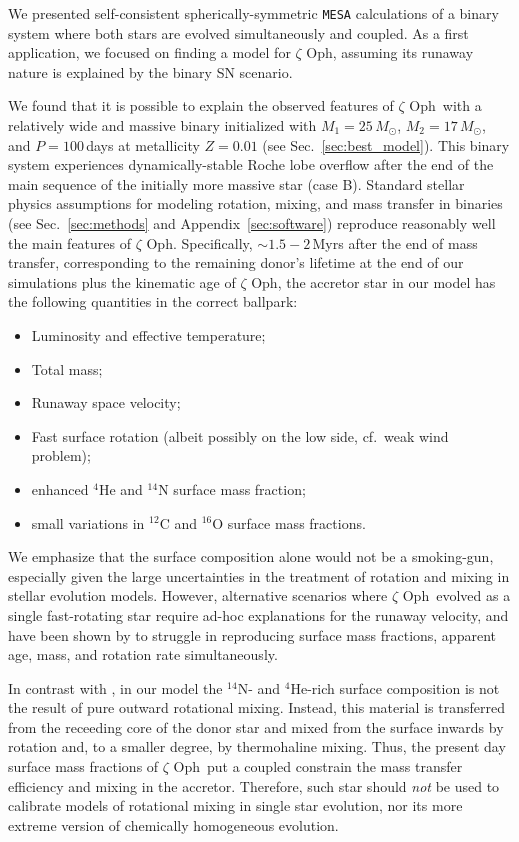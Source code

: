 \documentclass[twocolumn,twocolappendix,trackchanges]{aastex63}
\DeclareRobustCommand{\Secref}[1]{Sec.~\ref{#1}}
\newcommand{\zoph}{$\zeta$ Oph}
\begin{document}
We presented self-consistent spherically-symmetric \texttt{MESA}
calculations of a binary system where both stars are evolved
simultaneously and coupled. As a first application, we focused on
finding a model for \zoph, assuming its runaway nature is explained by
the binary SN scenario.

We found that it is possible to explain the observed features of
\zoph\ with a relatively wide and massive binary initialized with
$M_1=25\,M_\odot$, $M_2=17\,M_\odot$, and $P=100$\,days at metallicity
$Z=0.01$ (see \Secref{sec:best_model}). This binary system experiences dynamically-stable Roche
lobe overflow after the end of the main sequence of the initially more massive star
(case B). Standard stellar physics assumptions for modeling rotation,
mixing, and mass transfer in binaries (see \Secref{sec:methods} and
Appendix~\ref{sec:software}) reproduce reasonably well the
main features of \zoph. Specifically,
$\sim$$1.5-2$\,Myrs after the end of mass transfer, corresponding to the
remaining donor's lifetime at the end of our simulations plus the kinematic age of \zoph,
the accretor star in our model has the following quantities in the correct ballpark:
\begin{itemize}
\item Luminosity and effective temperature;
\item Total mass;
\item Runaway space velocity;
\item Fast surface rotation (albeit possibly on the low side, cf.~weak wind problem);
\item enhanced $^4\mathrm{He}$ and $^{14}\mathrm{N}$ surface mass fraction;
\item small variations in $^{12}\mathrm{C}$ and $^{16}\mathrm{O}$ surface mass fractions.
\end{itemize}

We emphasize that the surface composition alone would not be a smoking-gun,
especially given the large uncertainties in the treatment of rotation
and mixing in stellar evolution models. However, alternative scenarios where \zoph\
evolved as a single fast-rotating star require ad-hoc explanations for the runaway velocity,
and have been shown by \citetalias{villamariz:05} to struggle in reproducing
surface mass fractions, apparent age, mass, and rotation rate simultaneously.

In contrast with \cite{vanrensbergen:96}, in our model the
$^{14}\mathrm{N}$- and $^4\mathrm{He}$-rich surface composition is not
the result of pure outward rotational mixing.  Instead, this material
is transferred from the receeding core of the donor star and mixed
from the surface inwards by rotation and, to a smaller degree, by
thermohaline mixing.  Thus, the present day surface mass fractions of
\zoph\ put a coupled constrain the mass transfer efficiency and mixing
in the accretor. Therefore, such star should \emph{not} be used to
calibrate models of rotational mixing in single star evolution, nor
its more extreme version of chemically homogeneous evolution.
\end{document}
